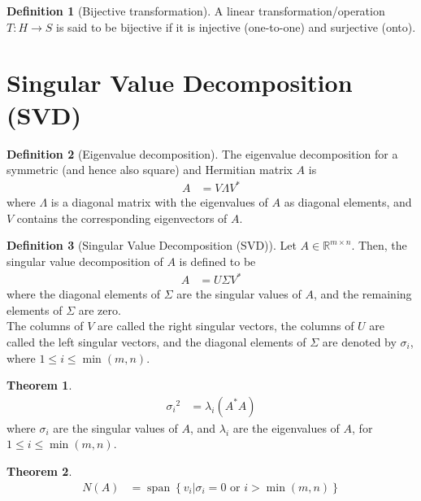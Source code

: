 \documentclass[titlepage, fleqn, a4paper, 12pt, twoside]{article}
\theoremstyle{definition}
\newtheorem{definition}{Definition}
\theoremstyle{theorem}
\newtheorem{theorem}{Theorem}
\DeclareMathOperator{\vspan}{\mathrm{span}}
\begin{document}
\begin{definition}[Bijective transformation]
	A linear transformation/operation $T: H \to S$ is said to be bijective if it is injective (one-to-one) and surjective (onto).
\end{definition}

\section{Singular Value Decomposition (SVD)}

\begin{definition}[Eigenvalue decomposition]
	The eigenvalue decomposition for a symmetric (and hence also square) and Hermitian matrix $A$ is
	\begin{align*}
		A &= V \Lambda V^*
	\end{align*}
	where $\Lambda$ is a diagonal matrix with the eigenvalues of $A$ as diagonal elements, and $V$ contains the corresponding eigenvectors of $A$.
\end{definition}

\begin{definition}[Singular Value Decomposition (SVD)]
	Let $A \in \mathbb{R}^{m \times n}$.
	Then, the singular value decomposition of $A$ is defined to be
	\begin{align*}
		A &= U \Sigma V^*
	\end{align*}
	where the diagonal elements of $\Sigma$ are the singular values of $A$, and the remaining elements of $\Sigma$ are zero.\\
	The columns of $V$ are called the right singular vectors, the columns of $U$ are called the left singular vectors, and the diagonal elements of $\Sigma$ are denoted by $\sigma_i$, where $1 \le i \le \min(m,n)$.
\end{definition}

\begin{theorem}
	\begin{align*}
		{\sigma_i}^2 &= \lambda_i \left( A^* A \right)
	\end{align*}
	where $\sigma_i$ are the singular values of $A$, and $\lambda_i$ are the eigenvalues of $A$, for $1 \le i \le \min(m,n)$.
\end{theorem}

\begin{theorem}
	\begin{align*}
		N(A) &= \vspan\left\{ v_i \Big| \sigma_i = 0 \text{ or } i > \min(m,n) \right\}
	\end{align*}
\end{theorem}
\end{document}
